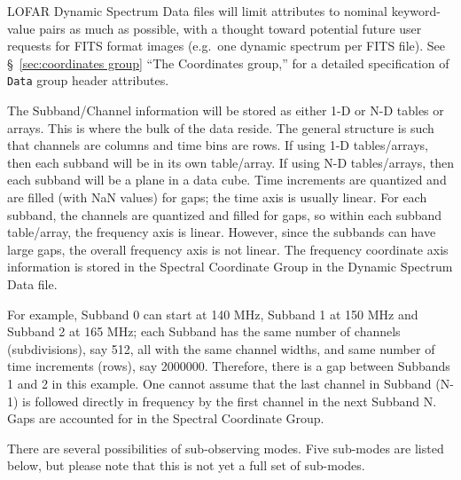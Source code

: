 \documentclass[a4paper,10pt,bibtotoc]{scrartcl}
\begin{document}
LOFAR Dynamic Spectrum Data files will limit attributes to nominal keyword-value
pairs as much as possible, with a thought toward potential future user requests
for FITS format images (e.g.~one dynamic spectrum per FITS file).  
See \S\ \ref{sec:coordinates group} ``The Coordinates
group,'' for a detailed specification of \texttt{Data} group header attributes. 

The Subband/Channel information will be stored as either 1-D or N-D tables or
arrays.  This is where the bulk of the data reside.  The
general structure is such that channels are columns and time bins are rows.  If
using 1-D tables/arrays, then each subband will be in its own table/array.  If
using N-D tables/arrays, then each subband will be a plane in a data cube.  
Time increments are quantized and are filled (with NaN values)
for gaps;  the time axis is usually linear.  For each subband, the channels are
quantized and filled for gaps, so within each subband table/array, the frequency
axis is linear.  However, since the subbands can have large gaps, the
overall frequency axis is not linear.  The frequency coordinate axis information
is stored in the Spectral Coordinate Group in the Dynamic Spectrum Data file.   

For example, Subband 0 can start at 140 MHz, Subband 1 at 150 MHz and Subband 2 at
165 MHz;  each Subband has the same number of channels (subdivisions), say 512,
all with the same channel widths, and same number of time increments (rows), say
2000000.  Therefore, there is a gap between Subbands 1 and 2 in this example.  One
cannot assume that the last channel in Subband (N-1) is followed directly in
frequency by the first channel in the next Subband N.  Gaps are accounted for in
the Spectral Coordinate Group. 


There are several possibilities of sub-observing modes. Five
sub-modes are listed below, but please note that this is not yet a full set of
sub-modes. 
\end{document}
